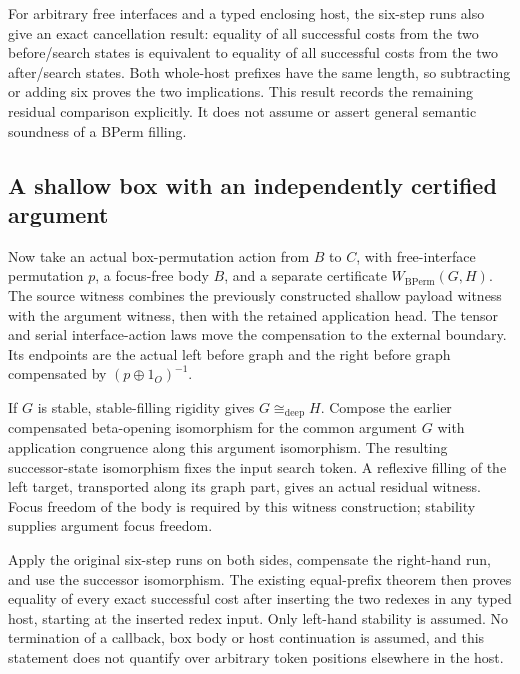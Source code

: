 
For arbitrary free interfaces and a typed enclosing host, the six-step runs
also give an exact cancellation result: equality of all successful costs
from the two before/search states is equivalent to equality of all successful
costs from the two after/search states. Both whole-host prefixes have the
same length, so subtracting or adding six proves the two implications.
This result records the remaining residual comparison explicitly. It does
not assume or assert general semantic soundness of a BPerm filling.


\subsection{A shallow box with an independently certified argument}
Now take an actual box-permutation action from $B$ to $C$, with free-interface
permutation $p$, a focus-free body $B$, and a separate certificate
$W_{\mathrm{BPerm}}(G,H)$.
The source witness combines the previously constructed shallow payload
witness with the argument witness, then with the retained application head.
The tensor and serial interface-action laws move the compensation to the
external boundary. Its endpoints are the actual left before graph and the
right before graph compensated by $(p\oplus 1_O)^{-1}$.


If $G$ is stable, stable-filling rigidity gives $G\cong_{\mathrm{deep}}H$.
Compose the earlier compensated beta-opening isomorphism for the common
argument $G$ with application congruence along this argument isomorphism.
The resulting successor-state isomorphism fixes the input search token.
A reflexive filling of the left target, transported along its graph part,
gives an actual residual witness. Focus freedom of the body is required by
this witness construction; stability supplies argument focus freedom.


Apply the original six-step runs on both sides, compensate the right-hand
run, and use the successor isomorphism. The existing equal-prefix theorem
then proves equality of every exact successful cost after inserting the two
redexes in any typed host, starting at the inserted redex input.
Only left-hand stability is assumed. No termination of a callback, box body
or host continuation is assumed, and this statement does not quantify over
arbitrary token positions elsewhere in the host.

